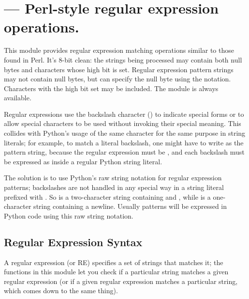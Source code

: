 \section{ ---
         Perl-style regular expression operations.}




This module provides regular expression matching operations similar to
those found in Perl.  It's 8-bit clean: the strings being processed
may contain both null bytes and characters whose high bit is set.  Regular
expression pattern strings may not contain null bytes, but can specify
the null byte using the  notation.
Characters with the high bit set may be included.  The 
module is always available.

Regular expressions use the backslash character (\character{\e}) to
indicate special forms or to allow special characters to be used
without invoking their special meaning.  This collides with Python's
usage of the same character for the same purpose in string literals;
for example, to match a literal backslash, one might have to write
 as the pattern string, because the regular expression
must be \samp{\e\e}, and each backslash must be expressed as
\samp{\e\e} inside a regular Python string literal. 

The solution is to use Python's raw string notation for regular
expression patterns; backslashes are not handled in any special way in
a string literal prefixed with .  So  is a
two-character string containing \character{\e} and ,
while  is a one-character string containing a newline.
Usually patterns will be expressed in Python code using this raw
string notation.

\subsection{Regular Expression Syntax \label{re-syntax}}

A regular expression (or RE) specifies a set of strings that matches
it; the functions in this module let you check if a particular string
matches a given regular expression (or if a given regular expression
matches a particular string, which comes down to the same thing).

